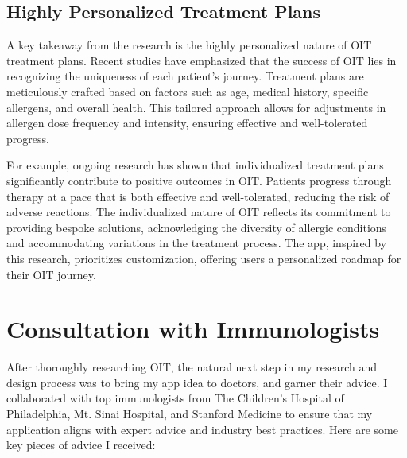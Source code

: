 \subsection{Highly Personalized Treatment Plans}

A key takeaway from the research is the highly personalized nature of OIT treatment plans. Recent studies have emphasized that the success of OIT lies in recognizing the uniqueness of each patient's journey. Treatment plans are meticulously crafted based on factors such as age, medical history, specific allergens, and overall health. This tailored approach allows for adjustments in allergen dose frequency and intensity, ensuring effective and well-tolerated progress.

For example, ongoing research has shown that individualized treatment plans significantly contribute to positive outcomes in OIT. Patients progress through therapy at a pace that is both effective and well-tolerated, reducing the risk of adverse reactions. The individualized nature of OIT reflects its commitment to providing bespoke solutions, acknowledging the diversity of allergic conditions and accommodating variations in the treatment process. The app, inspired by this research, prioritizes customization, offering users a personalized roadmap for their OIT journey.

\section{Consultation with Immunologists}
\label{section:consultingImmunologists}

After thoroughly researching OIT, the natural next step in my research and design process was to bring my app idea to doctors, and garner their advice. I collaborated with top immunologists from The Children's Hospital of Philadelphia, Mt. Sinai Hospital, and Stanford Medicine to ensure that my application aligns with expert advice and industry best practices. Here are some key pieces of advice I received:

